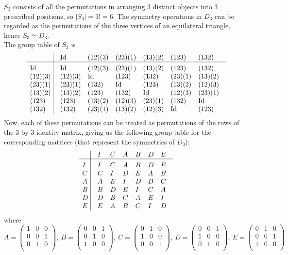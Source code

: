\documentclass[a4paper]{article}
\begin{document}
\begin{ans}
$S_3$ consists of all the permutations in arranging 3 distinct objects into 3 prescribed positions, so $|S_3|=3!=6$. The symmetry operations in $D_3$ can be regarded as the permutations of the three vertices of an equilateral triangle, hence $S_3\simeq D_3$.\\[5pt]
The group table of $S_3$ is
$$\vbox{\tabskip0.5em\offinterlineskip
    \halign{\strut$#$\hfil\ \tabskip1em\vrule&&$#$\hfil\cr
    & \Id & (12)(3) & (23)(1) & (13)(2) & (123) & (132)     \cr
    \noalign{\hrule}\vrule height 12pt width 0pt
    \Id  & \Id & (12)(3)   & (23)(1)   & (13)(2) & (123) & (132)     \cr
     (12)(3) & (12)(3) & \Id & (123)   & (132)   & (23)(1) & (13)(2)     \cr
    (23)(1) & (23)(1)   & (132)   & \Id  & (123) & (13)(2) & (12)(3)      \cr
    (13)(2) & (13)(2)  & (123)   & (132) & \Id   & (12)(3) & (23)(1)      \cr
    (123) & (123) & (13)(2) & (12)(3) & (23)(1) & (132) & \Id \cr
    (132) & (132)  & (23)(1)   & (13)(2)   & (12)(3)   & \Id & (123)     \cr
}}$$
Now, each of these permutations can be treated as permutations of the rows of the 3 by 3 identity matrix, giving us the following group table for the corresponding matrices (that represent the symmetries of $D_3$):
$$\vbox{\tabskip0.5em\offinterlineskip
    \halign{\strut$#$\hfil\ \tabskip1em\vrule&&$#$\hfil\cr
    & I & C & A & B & D & E     \cr
    \noalign{\hrule}\vrule height 12pt width 0pt
    I  & I & C & A & B & D & E    \cr
     C & C & I & D   & E   & A & B     \cr
    A & A  & E  & I  & D & B & C     \cr
    B & B  & D  & E & I & C & A     \cr
    D & D & B & C & A & E & I \cr
    E & E & A  & B & C  & I & D    \cr
}}$$
where
$$A=\begin{pmatrix}1&0&0\\0&0&1\\0&1&0\\\end{pmatrix},~B=\begin{pmatrix}0&0&1\\0&1&0\\1&0&0\\\end{pmatrix},~C=\begin{pmatrix}0&1&0\\1&0&0\\0&0&1\\\end{pmatrix},~D=\begin{pmatrix}0&0&1\\1&0&0\\0&1&0\\\end{pmatrix},~E=\begin{pmatrix}0&1&0\\0&0&1\\1&0&0\\\end{pmatrix}$$

\end{ans}
\end{document}

